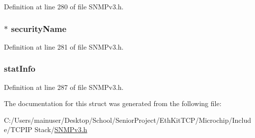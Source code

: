 Definition at line 280 of file S\+N\+M\+Pv3.\+h.

\hypertarget{structprocess_response_pdu_a4a48a8746988a1f761c3e9eadcc20463}{}
\subsubsection[{security\+Name}]{$\ast$ security\+Name}\label{structprocess_response_pdu_a4a48a8746988a1f761c3e9eadcc20463}


Definition at line 281 of file S\+N\+M\+Pv3.\+h.

\hypertarget{structprocess_response_pdu_ad07540e94950d793173ffdb63915b853}{}
\subsubsection[{stat\+Info}]{ stat\+Info}\label{structprocess_response_pdu_ad07540e94950d793173ffdb63915b853}


Definition at line 287 of file S\+N\+M\+Pv3.\+h.



The documentation for this struct was generated from the following file\+:\begin{DoxyCompactItemize}
\item 
C\+:/\+Users/mainuser/\+Desktop/\+School/\+Senior\+Project/\+Eth\+Kit\+T\+C\+P/\+Microchip/\+Include/\+T\+C\+P\+I\+P Stack/\hyperlink{_s_n_m_pv3_8h}{S\+N\+M\+Pv3.\+h}\end{DoxyCompactItemize}
